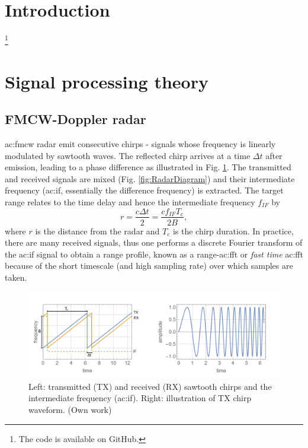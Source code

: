 \documentclass{article}
\begin{document}
\tableofcontents
\clearpage
\printglossary

\section{Introduction}

\footnote{The code is available on GitHub.\supercite{Code}}

\section{Signal processing theory}
\subsection{FMCW-Doppler radar}
\acrshort{ac:fmcw} radar emit consecutive chirps - signals whose frequency is linearly modulated by sawtooth waves. The reflected chirp arrives at a time \(\Delta t\) after emission, leading to a phase difference as illustrated in Fig. \ref{fig:Chirp}. The transmitted and received signals are mixed (Fig. \ref{fig:RadarDiagram}) and their intermediate frequency (\acrshort{ac:if}, essentially the difference frequency) is extracted. The target range relates to the time delay and hence the intermediate frequency \(f_{IF}\) by
\begin{equation}
	r = \frac{c \Delta t}{2} = \frac{c f_{IF} T_c}{2 B},
\end{equation}
where \(r\) is the distance from the radar and \(T_c\) is the chirp duration.\supercite{TIFMCWDoppler}
In practice, there are many received signals, thus one performs a discrete Fourier transform of the \acrshort{ac:if} signal to obtain a range profile, known as a range-\acrshort{ac:fft} or \textit{fast time} \acrshort{ac:fft} because of the short timescale (and high sampling rate) over which samples are taken.

\begin{figure}
	\centering
	\includegraphics[width=\textwidth]{chirp}
	\caption{Left: transmitted (TX) and received (RX) sawtooth chirps and the intermediate frequency (\acrshort{ac:if}). Right: illustration of TX chirp waveform. (Own work)}
	\label{fig:Chirp}
\end{figure}
\end{document}
